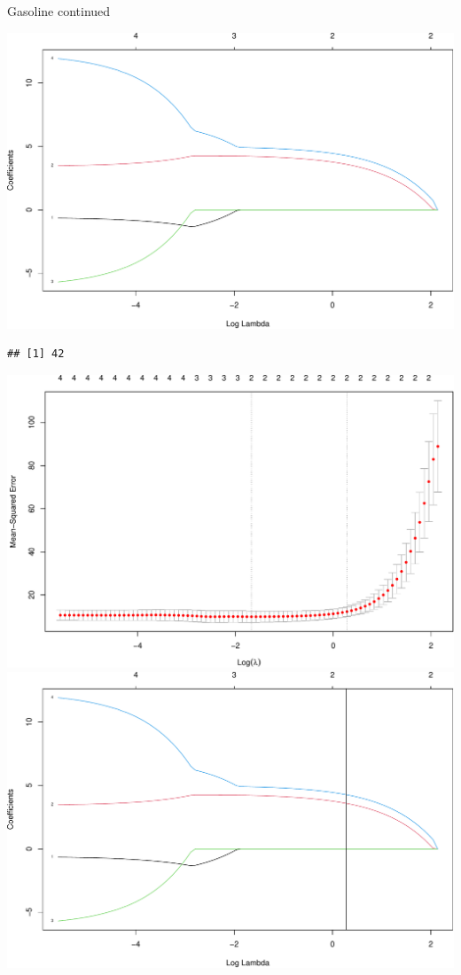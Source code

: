 \documentclass[
  ignorenonframetext,
]{beamer}
\begin{document}
\begin{frame}[fragile]

\begin{block}{Gasoline continued}

\includegraphics{L2_files/figure-beamer/unnamed-chunk-13-1.pdf}

\begin{verbatim}
## [1] 42
\end{verbatim}

\includegraphics{L2_files/figure-beamer/unnamed-chunk-13-2.pdf}
\includegraphics{L2_files/figure-beamer/unnamed-chunk-13-3.pdf}


\end{block}
\end{frame}
\end{document}
